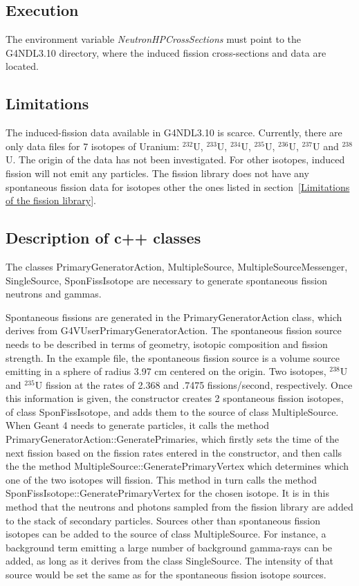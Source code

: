\documentclass[fleqn,11pt]{article}
\begin{document}
\subsection{Execution}

The environment variable \textit{NeutronHPCrossSections}
must point to the G4NDL3.10 directory, where the 
induced fission cross-sections and data are located.

\subsection{Limitations}

The induced-fission data available in 
G4NDL3.10 is scarce. Currently, there are only data files
for 7 isotopes of Uranium: $^{232}$U, $^{233}$U, $^{234}$U, 
$^{235}$U, $^{236}$U, $^{237}$U and $^{238}$U. The origin
of the data has not been investigated. For other isotopes,
induced fission will not emit any particles.
The fission library does not have any spontaneous fission
data for isotopes other the ones listed in 
section~\ref{Limitations of the fission library}.  

\subsection{Description of c++ classes}

The classes PrimaryGeneratorAction, MultipleSource,
MultipleSourceMessenger, SingleSource, SponFissIsotope
are necessary to generate spontaneous fission neutrons and
gammas.

Spontaneous fissions are generated in the 
PrimaryGeneratorAction class, which derives from 
G4VUserPrimaryGeneratorAction. The spontaneous fission source
needs to be described in terms of geometry, isotopic
composition and fission strength. In the example file, the 
spontaneous fission source is a volume source emitting in a
sphere of radius 3.97 cm centered on the origin. Two 
isotopes, $^{238}$U and $^{235}$U fission at the rates of 
2.368 and .7475 fissions/second, respectively. Once this 
information is given, the constructor creates 2 
spontaneous fission isotopes, of class SponFissIsotope, and
adds them to the source of class MultipleSource. When 
Geant 4 needs to generate particles, it calls the method 
PrimaryGeneratorAction::GeneratePrimaries, which firstly 
sets the time of the next fission based on the fission 
rates entered in the constructor, and then calls the the 
method MultipleSource::GeneratePrimaryVertex which 
determines which one of the two isotopes will fission. This
method in turn calls the method 
SponFissIsotope::GeneratePrimaryVertex for the chosen 
isotope. It is in this method that the neutrons and photons
sampled from the fission library are added to the stack of 
secondary particles.
Sources other than spontaneous fission isotopes can be added 
to the source of class MultipleSource. For instance, a 
background term emitting a large number of background 
gamma-rays can be added, as long as it derives from the 
class SingleSource. The intensity of that source would be 
set the same as for the spontaneous fission isotope sources.
\end{document}
